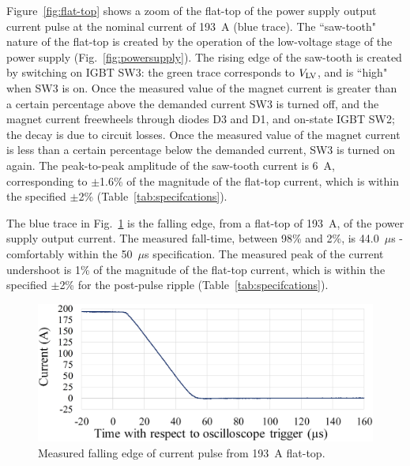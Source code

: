 \documentclass[aps,prab,twocolumn,superscriptaddress]{revtex4-1}
\begin{document}
Figure~\ref{fig:flat-top} shows a zoom of the flat-top of the power supply output current pulse at the nominal current of 193~A (blue trace). The ``saw-tooth" nature of the flat-top is created by the operation of the low-voltage stage of the power supply  (Fig.~\ref{fig:powersupply}).  The rising edge of the saw-tooth is created by switching on IGBT SW3: the green trace corresponds to $V_{\rm LV}$, and is ``high" when SW3 is on. Once the measured value of the magnet current is greater than a certain percentage above the demanded current SW3 is turned off, and the magnet current freewheels through diodes D3 and D1, and on-state 
IGBT SW2; the decay is due to circuit losses. Once the measured value of the magnet current is less than a certain percentage below the demanded current, SW3 is turned on again. The peak-to-peak amplitude of the saw-tooth current is 6~A, corresponding to $\pm$1.6\% of the magnitude of the flat-top current, which is within the specified $\pm$2\% (Table~\ref{tab:specifcations}).


The blue trace in Fig.~\ref{fig:falltime} is the falling edge, from a flat-top of 193~A, of the power supply output current. The measured fall-time, between 98\% and 2\%, is 44.0~$\mu$s - comfortably within the 50~$\mu$s specification. The measured peak of the current undershoot is 1\% of the magnitude of the flat-top current, which is within the specified $\pm$2\% for the post-pulse ripple (Table~\ref{tab:specifcations}).
\begin{figure}[h]
\includegraphics[width=\linewidth]{falltime-smaller} %
\caption{Measured falling edge of current pulse from 193~A flat-top.}
\label{fig:falltime}
\end{figure}
\end{document}
